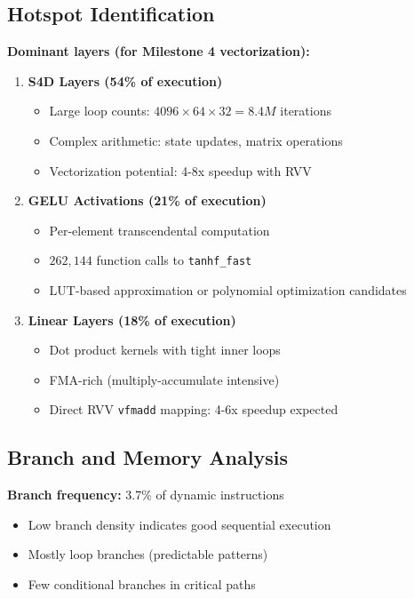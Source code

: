 \documentclass[conference]{IEEEtran}
\begin{document}
\subsection{Hotspot Identification}

\textbf{Dominant layers (for Milestone 4 vectorization):}

\begin{enumerate}
    \item \textbf{S4D Layers (54\% of execution)}
    \begin{itemize}
        \item Large loop counts: $4096 \times 64 \times 32 = 8.4M$ iterations
        \item Complex arithmetic: state updates, matrix operations
        \item Vectorization potential: 4-8x speedup with RVV
    \end{itemize}
    
    \item \textbf{GELU Activations (21\% of execution)}
    \begin{itemize}
        \item Per-element transcendental computation
        \item $262,144$ function calls to \texttt{tanhf\_fast}
        \item LUT-based approximation or polynomial optimization candidates
    \end{itemize}
    
    \item \textbf{Linear Layers (18\% of execution)}
    \begin{itemize}
        \item Dot product kernels with tight inner loops
        \item FMA-rich (multiply-accumulate intensive)
        \item Direct RVV \texttt{vfmadd} mapping: 4-6x speedup expected
    \end{itemize}
\end{enumerate}

\subsection{Branch and Memory Analysis}

\textbf{Branch frequency:} 3.7\% of dynamic instructions
\begin{itemize}
    \item Low branch density indicates good sequential execution
    \item Mostly loop branches (predictable patterns)
    \item Few conditional branches in critical paths
\end{itemize}
\end{document}
